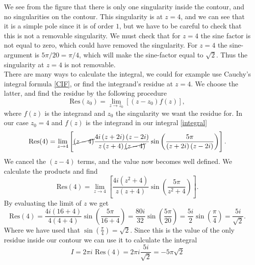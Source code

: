 \documentclass[12pt,twoside]{article}
\begin{document}
We see from the figure that there is only one singularity inside the contour, and no singularities on the contour. This singularity is at $z=4$, and we can see that it is a simple pole since it is of order $1$, but we have to be careful to check that this is not a removable singularity. We must check that for $z=4$ the sine factor is not equal to zero, which could have removed the singularity. For $z=4$ the sine-argument is $5\pi/20=\pi/4$, which will make the sine-factor equal to $\sqrt{2}$. Thus the singularity at $z=4$ is not removable.\\
There are many ways to calculate the integral, we could for example use Cauchy's integral formula \eqref{CIF}, or find the integrand's residue at $z=4$. We choose the latter, and find the residue by the following procedure
\begin{equation}
  \text{Res}(z_0) = \lim_{z \to z_0} \left[(z-z_0)f(z)\right],
\end{equation}
where $f(z)$ is the integrand and $z_0$ the singularity we want the residue for. In our case $z_0=4$ and $f(z)$ is the integrand in our integral \eqref{integral}
\begin{equation}
    \text{Res}(4) = \lim_{z \to 4}\left[\cancel{(z-4)}\frac{4i\left(z+2i\right)\left(z-2i\right)}{z\left(z+4\right)\cancel{\left(z-4\right)}}\sin{\left( \frac{5\pi}{\left(z+2i\right)\left(z-2i\right)} \right)}\right].
\end{equation}
We cancel the $(z-4)$ terms, and the value now becomes well defined. We calculate the products and find
\begin{equation}
    \text{Res}(4) = \lim_{z \to 4}\left[\frac{4i\left(z^2+4\right)}{z\left(z+4\right)}\sin{\left( \frac{5\pi}{z^2+4} \right)}\right].
\end{equation}
By evaluating the limit of $z$ we get
\begin{equation}
    \text{Res}(4) = \frac{4i\left(16+4\right)}{4\left(4+4\right)}\sin{\left( \frac{5\pi}{16+4} \right)} = \frac{80i}{32}\sin{\left( \frac{5\pi}{20} \right)} = \frac{5i}{2}\sin{\left(\frac{\pi}{4}\right)} = \frac{5i}{\sqrt{2}}.
\end{equation}
Where we have used that $\sin{\left(\frac{\pi}{4}\right)}=\sqrt{2}$. Since this is the value of the only residue inside our contour we can use it to calculate the integral
\begin{equation}
  I  = 2\pi i\,\,\text{Res}(4) = 2\pi i\frac{5i}{\sqrt{2}} = -5\pi\sqrt{2}
\end{equation}
\newpage
\end{document}
